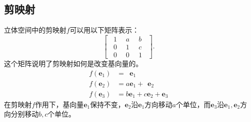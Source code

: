 \documentclass[12pt,UTF8]{ctexbook}
\begin{document}
\subsection{剪映射}
立体空间中的剪映射$f$可以用以下矩阵表示：
$$ \begin{bmatrix}
    \phantom{0}1 & \phantom{0}a\phantom{0} & b\phantom{0} \\ \phantom{0}0 & \phantom{0}1\phantom{0} & c\phantom{0} \\ \phantom{0}0 & \phantom{0}0\phantom{0} & 1\phantom{0}
\end{bmatrix}. $$
这个矩阵说明了剪映射如何是改变基向量的。
\begin{align*}
    f(\mathbf{e}_1) &= \phantom{a}\mathbf{e}_1 \\
    f(\mathbf{e}_2) &= a\mathbf{e}_1 + \phantom{c}\mathbf{e}_2 \\
    f(\mathbf{e}_3) &= b\mathbf{e}_1 + c\mathbf{e}_2 + \mathbf{e}_3 
\end{align*}
在剪映射$f$作用下，基向量$\mathbf{e}_1$保持不变，$\mathbf{e}_2$沿$\mathbf{e}_1$方向移动$a$个单位，而$\mathbf{e}_3$沿$\mathbf{e}_1, \mathbf{e}_2$方向分别移动$b,c$个单位。
\end{document}
